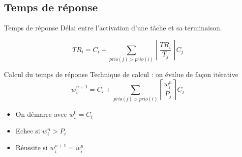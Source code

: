 \subsection{Temps de réponse}

\begin{frame}{Temps de réponse}
  Délai entre l'activation d'une tâche et sa terminaison. 

  $$TR_i = C_i + \sum_{prio(j) > prio(i)} \left\lceil\frac{TR_i}{T_j}\right\rceil C_j$$

\end{frame}

\begin{frame}{Calcul du temps de réponse}
  Technique de calcul : on évalue de façon itérative
  $$w_i^{n+1}=C_i+\sum_{prio(j) > prio(i)} \left\lceil\frac{w_i^n}{P_j}\right\rceil C_j$$

  \begin{itemize}
    \item On démarre avec $w_i^0 = C_i$
    \item Echec si $w_i^n > P_i$
    \item Réussite si $w_i^{n+1} = w_i^n$
  \end{itemize}
\end{frame} 

